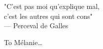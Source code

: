\cleardoublepage
\thispagestyle{empty}


\vspace*{3cm}

\begin{raggedleft}
    "C'est pas moi qu'explique mal, \\
    c'est les autres qui sont cons" \\
     --- Perceval de Galles\\
\end{raggedleft}

\vspace{4cm}

\begin{center}
    To M\'elanie\dots
\end{center}


